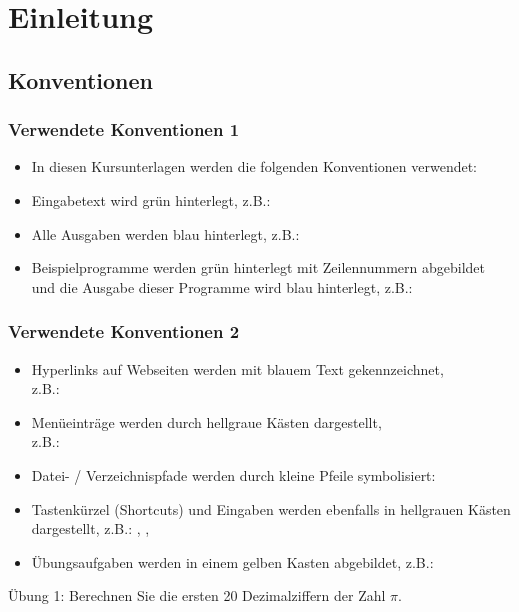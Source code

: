 



\setcounter{mchapter}{1}
\setcounter{mexercise}{0}


    

    \section{Einleitung}

    \subsection{Konventionen}
    \begin{frame}
        \frametitle{Verwendete Konventionen 1}
        \begin{itemize}
            \item In diesen Kursunterlagen werden die folgenden Konventionen verwendet:
            \item Eingabetext wird grün hinterlegt, z.B.: 
            \item Alle Ausgaben werden blau hinterlegt, z.B.: 
            \item Beispielprogramme werden grün hinterlegt mit Zeilennummern abgebildet und die Ausgabe dieser Programme
            wird blau hinterlegt, z.B.:
        \end{itemize}
        \vspace{-0.5cm}
    \end{frame}

    \begin{frame}
        \frametitle{Verwendete Konventionen 2}
        \begin{itemize}
            \item Hyperlinks auf Webseiten werden mit blauem Text gekennzeichnet, \\
            z.B.: 
            \item Menüeinträge werden durch hellgraue Kästen dargestellt, \\
            z.B.: 
            \item Datei- / Verzeichnispfade werden durch kleine Pfeile symbolisiert: 
            \item Tastenkürzel (Shortcuts) und Eingaben werden ebenfalls in hellgrauen Kästen dargestellt, z.B.: , \keys{\return}, 
            \item Übungsaufgaben werden in einem gelben Kasten abgebildet, z.B.:
        \end{itemize}
        \begin{exercise}
            \sloppy
            Übung 1: Berechnen Sie die ersten 20 Dezimalziffern der Zahl $\pi$.
        \end{exercise}
    \end{frame}

